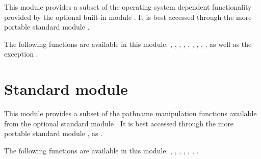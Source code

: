 This module provides a subset of the operating system dependent
functionality provided by the optional built-in module .
It is best accessed through the more portable standard module
.

The following functions are available in this module:
,
,
,
,
,
,
,
,
,
as well as the exception .

\section{Standard module }

This module provides a subset of the pathname manipulation functions
available from the optional standard module .  It is
best accessed through the more portable standard module , as
.

The following functions are available in this module:
,
,
,
,
,
,
.
